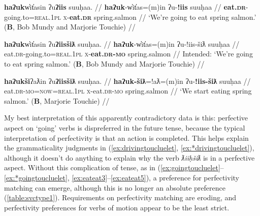 \ex \label{ex:eateat3}
\begingl
\glpreamble \textbf{haʔuk}w̓it̓asin ʔu\textbf{ʔiis} suuḥaa. //
\gla \textbf{haʔuk}-w̓it̓as=(m)in ʔu-\textbf{!iis} suuḥaa //
\glb \textbf{eat.\textsc{dr}}-going.to=\textsc{real.1pl} \textsc{x}-\textbf{eat.\textsc{dr}} spring.salmon //
\glft `We're going to eat spring salmon.' (\textbf{B}, Bob Mundy and Marjorie Touchie) //
\endgl
\xe

\ex \label{ex:*eateat4}
\begingl
\glpreamble *\textbf{haʔuk}w̓it̓asin ʔu\textbf{ʔiisšiƛ} suuḥaa. //
\gla \textbf{haʔuk}-w̓it̓as=(m)in ʔu-!iis-šiƛ suuḥaa //
\glb eat.\textsc{dr}-going.to=\textsc{real.1pl} \textsc{x}-\textbf{eat.\textsc{dr}-\textsc{mo}} spring.salmon //
\glft Intended: `We're going to eat spring salmon.' (\textbf{B}, Bob Mundy and Marjorie Touchie) //
\endgl
\xe

\ex \label{ex:eateat5}
\begingl
\glpreamble \textbf{haʔukši}ʔaƛin ʔu\textbf{ʔiisšiƛ} suuḥaa. //
\gla \textbf{haʔuk-šiƛ}=!aƛ=(m)in ʔu-\textbf{!iis-šiƛ} suuḥaa //
\glb eat.\textsc{dr}-\textsc{mo}=\textsc{now}=\textsc{real.1pl} \textsc{x}-eat.\textsc{dr}-\textsc{mo} spring.salmon //
\glft `We start eating spring salmon.' (\textbf{B}, Marjorie Touchie) //
\endgl
\xe

My best interpretation of this apparently contradictory data is this: perfective aspect on `going' verbs is dispreferred in the future tense, because the typical interpretation of perfectivity is that an action is completed. This helps explain the grammaticality judgments in (\ref{ex:drivingtoucluelet}, \ref{ex:*drivingtoucluelet}), although it doesn't do anything to explain why the verb \textit{ƛiiḥšiƛ} is in a perfective aspect. Without this complication of tense, as in (\ref{ex:goingtoucluelet}--\ref{ex:*goingtoucluelet}, \ref{ex:eateat3}--\ref{ex:eateat5}), a preference for perfectivity matching can emerge, although this is no longer an absolute preference (\cref{table:svctype1}). Requirements on perfectivity matching are eroding, and perfectivity preferences for verbs of motion appear to be the least strict.

